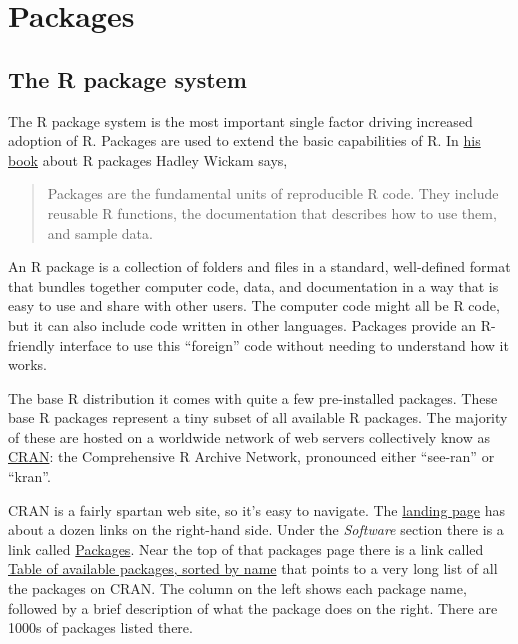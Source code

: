 \documentclass[
]{book}
\begin{document}
\hypertarget{packages}{%
\chapter{Packages}\label{packages}}

\hypertarget{package-system}{%
\section{The R package system}\label{package-system}}

The R package system is the most important single factor driving increased adoption of R. Packages are used to extend the basic capabilities of R. In \href{http://r-pkgs.had.co.nz}{his book} about R packages Hadley Wickam says,

\begin{quote}
Packages are the fundamental units of reproducible R code. They include reusable R functions, the documentation that describes how to use them, and sample data.
\end{quote}

An R package is a collection of folders and files in a standard, well-defined format that bundles together computer code, data, and documentation in a way that is easy to use and share with other users. The computer code might all be R code, but it can also include code written in other languages. Packages provide an R-friendly interface to use this ``foreign'' code without needing to understand how it works.

The base R distribution it comes with quite a few pre-installed packages. These base R packages represent a tiny subset of all available R packages. The majority of these are hosted on a worldwide network of web servers collectively know as \href{http://cran.r-project.org}{CRAN}: the Comprehensive R Archive Network, pronounced either ``see-ran'' or ``kran''.

CRAN is a fairly spartan web site, so it's easy to navigate. The \href{http://cran.r-project.org}{landing page} has about a dozen links on the right-hand side. Under the \emph{Software} section there is a link called \href{http://cran.r-project.org/web/packages/}{Packages}. Near the top of that packages page there is a link called \href{http://cran.r-project.org/web/packages/available_packages_by_name.html}{Table of available packages, sorted by name} that points to a very long list of all the packages on CRAN. The column on the left shows each package name, followed by a brief description of what the package does on the right. There are 1000s of packages listed there.
\end{document}
